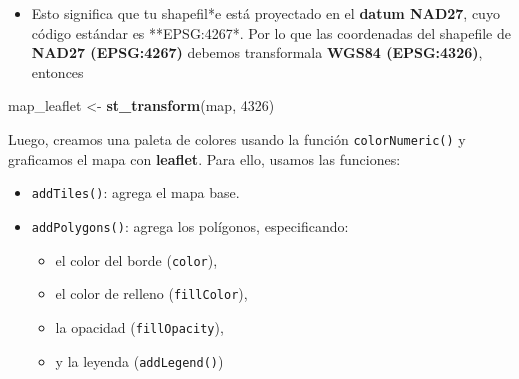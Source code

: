 \documentclass[
]{book}
\newenvironment{Shaded}{\begin{snugshade}}{\end{snugshade}}
\newcommand{\DecValTok}[1]{\textcolor[rgb]{0.00,0.00,0.81}{#1}}
\newcommand{\FunctionTok}[1]{\textcolor[rgb]{0.13,0.29,0.53}{\textbf{#1}}}
\newcommand{\NormalTok}[1]{#1}
\newcommand{\OtherTok}[1]{\textcolor[rgb]{0.56,0.35,0.01}{#1}}
\providecommand{\tightlist}{%
  \setlength{\itemsep}{0pt}\setlength{\parskip}{0pt}}
\begin{document}
\begin{itemize}
\tightlist
\item
  Esto significa que tu shapefil*e está proyectado en el \textbf{datum NAD27}, cuyo código estándar es **EPSG:4267*. Por lo que las coordenadas del shapefile de \textbf{NAD27 (EPSG:4267)} debemos transformala \textbf{WGS84 (EPSG:4326)}, entonces
\end{itemize}

\begin{Shaded}
\begin{Highlighting}[]
\NormalTok{map\_leaflet }\OtherTok{\textless{}{-}} \FunctionTok{st\_transform}\NormalTok{(map, }\DecValTok{4326}\NormalTok{)}
\end{Highlighting}
\end{Shaded}

Luego, creamos una paleta de colores usando la función \texttt{colorNumeric()} y graficamos el mapa con \textbf{leaflet}. Para ello, usamos las funciones:

\begin{itemize}
\tightlist
\item
  \texttt{addTiles()}: agrega el mapa base.\\
\item
  \texttt{addPolygons()}: agrega los polígonos, especificando:

  \begin{itemize}
  \tightlist
  \item
    el color del borde (\texttt{color}),\\
  \item
    el color de relleno (\texttt{fillColor}),\\
  \item
    la opacidad (\texttt{fillOpacity}),\\
  \item
    y la leyenda (\texttt{addLegend()})
  \end{itemize}
\end{itemize}
\end{document}
